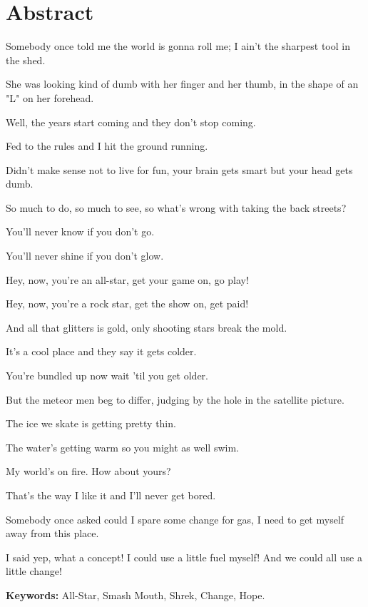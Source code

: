 \chapter*{Abstract}

Somebody once told me the world is gonna roll me; I ain't the sharpest tool in the shed.

She was looking kind of dumb with her finger and her thumb, in the shape of an "L" on her forehead.

Well, the years start coming and they don't stop coming.

Fed to the rules and I hit the ground running.

Didn't make sense not to live for fun, your brain gets smart but your head gets dumb.

So much to do, so much to see, so what's wrong with taking the back streets?

You'll never know if you don't go.

You'll never shine if you don't glow.

Hey, now, you're an all-star, get your game on, go play!

Hey, now, you're a rock star, get the show on, get paid!

And all that glitters is gold, only shooting stars break the mold.

It's a cool place and they say it gets colder.

You're bundled up now wait 'til you get older.

But the meteor men beg to differ, judging by the hole in the satellite picture.

The ice we skate is getting pretty thin.

The water's getting warm so you might as well swim.

My world's on fire. How about yours?

That's the way I like it and I'll never get bored.

Somebody once asked could I spare some change for gas, I need to get myself away from this place.

I said yep, what a concept! I could use a little fuel myself! And we could all use a little change!


\vfill
\textbf{Keywords:} All-Star, Smash Mouth, Shrek, Change, Hope.
\clearpage